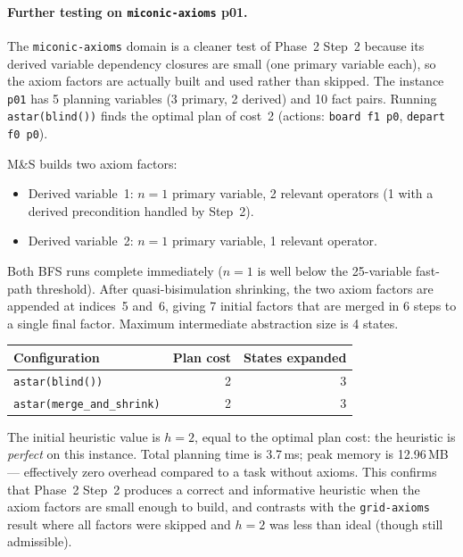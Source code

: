 \documentclass[11pt,a4paper]{article}
\begin{document}
\begin{itemize}
    \paragraph{Further testing on \texttt{miconic-axioms} p01.}

    The \texttt{miconic-axioms} domain is a cleaner test of Phase~2
    Step~2 because its derived variable dependency closures are small (one
    primary variable each), so the axiom factors are actually built and used
    rather than skipped.  The instance \texttt{p01} has 5 planning variables
    (3 primary, 2 derived) and 10 fact pairs.  Running \texttt{astar(blind())}
    finds the optimal plan of cost~2 (actions: \texttt{board f1 p0},
    \texttt{depart f0 p0}).

    M\&S builds two axiom factors:
    \begin{itemize}
      \item Derived variable~1: $n = 1$ primary variable, 2 relevant operators
        (1 with a derived precondition handled by Step~2).
      \item Derived variable~2: $n = 1$ primary variable, 1 relevant operator.
    \end{itemize}
    Both BFS runs complete immediately ($n = 1$ is well below the 25-variable
    fast-path threshold).  After quasi-bisimulation shrinking, the two axiom
    factors are appended at indices~5 and~6, giving 7 initial factors that are
    merged in 6 steps to a single final factor.  Maximum intermediate
    abstraction size is 4 states.

    \begin{center}
    \begin{tabular}{lrr}
    \toprule
    \textbf{Configuration} & \textbf{Plan cost} & \textbf{States expanded} \\
    \midrule
    \texttt{astar(blind())}            & 2 & 3 \\
    \texttt{astar(merge\_and\_shrink)} & 2 & 3 \\
    \bottomrule
    \end{tabular}
    \end{center}

    The initial heuristic value is $h = 2$, equal to the optimal plan cost:
    the heuristic is \emph{perfect} on this instance.  Total planning time is
    3.7\,ms; peak memory is 12.96\,MB --- effectively zero overhead compared
    to a task without axioms.  This confirms that Phase~2 Step~2 produces a
    correct and informative heuristic when the axiom factors are small enough
    to build, and contrasts with the \texttt{grid-axioms} result where all
    factors were skipped and $h = 2$ was less than ideal (though still
    admissible).


\end{itemize}
\end{document}
